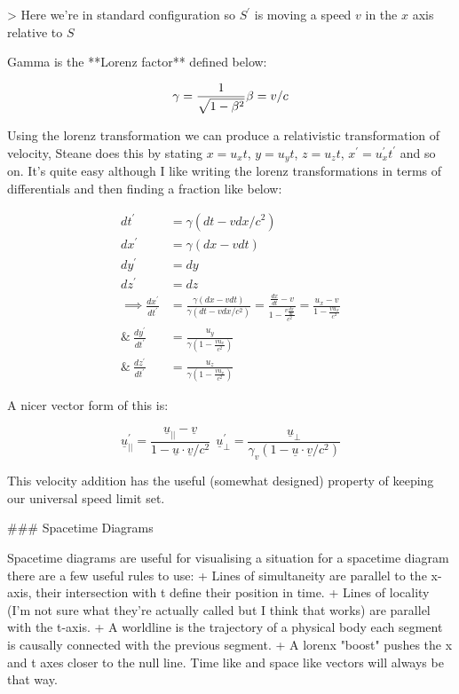 > Here we're in standard configuration so $S^\prime$ is moving a speed $v$ in the $x$ axis relative to $S$

Gamma is the **Lorenz factor** defined below:

$$
\gamma = \frac{1}{\sqrt{1-\beta^2}}\\
\beta = v/c
$$

Using the lorenz transformation we can produce a relativistic transformation of velocity, Steane does this by stating $x=u_xt$, $y=u_yt$, $z=u_zt$, $x^\prime=u_x^\prime t^\prime$ and so on. It's quite easy although I like writing the lorenz transformations in terms of differentials and then finding a fraction like below:

$$
\begin{aligned}
    dt^\prime &= \gamma(dt-vdx/c^2)\\
    dx^\prime &= \gamma(dx -vdt)\\
    dy^\prime &= dy\\
    dz^\prime &= dz\\
    \implies \frac{dx^\prime}{dt^\prime} &= \frac{\gamma(dx -vdt)}{\gamma(dt-vdx/c^2)} = \frac{\frac{dx}{dt} - v}{1 - \frac{v\frac{dx}{dt}}{c^2}} = \frac{u_x - v}{1 - \frac{vu_x}{c^2}}\\
    \&\ \frac{dy^\prime}{dt^\prime} &= \frac{u_y}{\gamma(1 - \frac{vu_x}{c^2})}\\
    \&\ \frac{dz^\prime}{dt^\prime} &= \frac{u_z}{\gamma(1 - \frac{vu_x}{c^2})}
\end{aligned}
$$

A nicer vector form of this is:

$$
\underline{u}^\prime_{||} = \frac{\underline{u}_{||} - \underline{v}}{1 - \underline{u}\cdot\underline{v}/c^2}\ \ \underline{u}^\prime_\perp = \frac{\underline{u}_\perp}{\gamma_v(1-\underline{u}\cdot\underline{v}/c^2)}
$$

This velocity addition has the useful (somewhat designed) property of keeping our universal speed limit set.

### Spacetime Diagrams

Spacetime diagrams are useful for visualising a situation for a spacetime diagram there are a few useful rules to use:
+ Lines of simultaneity are parallel to the x-axis, their intersection with t define their position in time.
+ Lines of locality (I'm not sure what they're actually called but I think that works) are parallel with the t-axis.
+ A worldline is the trajectory of a physical body each segment is causally connected with the previous segment.
+ A lorenx "boost" pushes the x and t axes closer to the null line. Time like and space like vectors will always be that way. 



